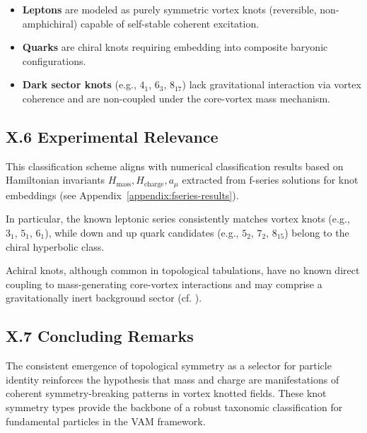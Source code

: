 \documentclass[11pt]{article}
\begin{document}
    \begin{itemize}
        \item \textbf{Leptons} are modeled as purely symmetric vortex knots (reversible, non-amphichiral) capable of self-stable coherent excitation.
        \item \textbf{Quarks} are chiral knots requiring embedding into composite baryonic configurations.
        \item \textbf{Dark sector knots} (e.g., $4_1$, $6_3$, $8_{17}$) lack gravitational interaction via vortex coherence and are non-coupled under the core-vortex mass mechanism.
    \end{itemize}

    \subsection*{X.6 Experimental Relevance}

    This classification scheme aligns with numerical classification results based on Hamiltonian invariants $H_\text{mass}, H_\text{charge}, a_\mu$ extracted from f-series solutions for knot embeddings (see Appendix~\ref{appendix:fseries-results}).

    In particular, the known leptonic series consistently matches vortex knots (e.g., $3_1$, $5_1$, $6_1$), while down and up quark candidates (e.g., $5_2$, $7_2$, $8_15$) belong to the chiral hyperbolic class.

    Achiral knots, although common in topological tabulations, have no known direct coupling to mass-generating core-vortex interactions and may comprise a gravitationally inert background sector (cf. \cite{VAMChapters}).

    \subsection*{X.7 Concluding Remarks}

    The consistent emergence of topological symmetry as a selector for particle identity reinforces the hypothesis that mass and charge are manifestations of coherent symmetry-breaking patterns in vortex knotted fields. These knot symmetry types provide the backbone of a robust taxonomic classification for fundamental particles in the VAM framework.

    
    
\end{document}
